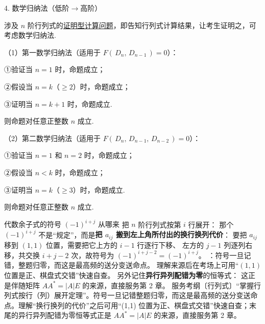 \begin{fcard}{4. 数学归纳法（低阶$\to$高阶）}

涉及 $n$ 阶行列式的\underline{证明型计算问题}，即告知行列式计算结果，让考生证明之，可考虑数学归纳法.

（1）第一数学归纳法（适用于 $F(\,D_n,\,D_{n-1}\,)=0$）：

①验证当 $n=1$ 时，命题成立；

②假设当 $n=k$（$\ge2$）时，命题成立；

③证明当 $n=k+1$ 时，命题成立.

则命题对任意正整数 $n$ 成立.

（2）第二数学归纳法（适用于 $F(\,D_n,\,D_{n-1},\,D_{n-2}\,)=0$）：

①验证当 $n=1$ 和 $n=2$ 时，命题成立；

②假设当 $n<k$ 时，命题成立；

③证明当 $n=k$（$\ge3$）时，命题成立.

则命题对任意正整数 $n$ 成立.
\end{fcard}


\begin{fdeep}{代数余子式的符号 $(-1)^{i+j}$ 从哪来}
把 $n$ 阶行列式按第 $i$ 行展开：
那个 $(-1)^{i+j}$ 不是“规定”，而是\textbf{把 $a_{ij}$ 搬到左上角所付出的换行换列代价}：
要把 $a_{ij}$ 移到 $(1,1)$ 位置，需要把它上方的 $i-1$ 行逐行下移、
左方的 $j-1$ 列逐列右移，共交换 $i+j-2$ 次，故符号为 $(-1)^{i+j-2}=(-1)^{i+j}$。
\fbref{}：符号一旦记错，整题归零，而这是最高频的送分变送命点。
理解来源后在考场上可用“$(1,1)$ 位置是正、棋盘式交错”快速自查。
另外记住\textbf{异行异列配错为零}的恒等式：
这正是伴随矩阵 $AA^{*}=|A|E$ 的来源，直接服务第 2 章。
\fbref{}服务考纲〔行列式〕“掌握行列式按行（列）展开定理”。符号一旦记错整题归零，而这是最高频的送分变送命点。理解“换行换列的代价”之后可用“(1,1) 位置为正、棋盘式交错”快速自查；末尾的异行异列配错为零恒等式正是 $AA^{*}=|A|E$ 的来源，直接服务第 2 章。
\end{fdeep}

